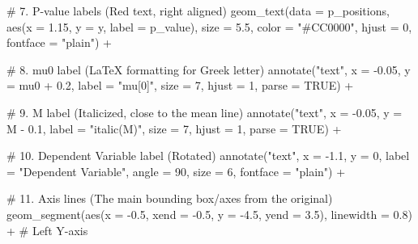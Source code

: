 \documentclass[
  letterpaper,
  DIV=11,
  numbers=noendperiod]{scrreprt}
\newenvironment{Shaded}{\begin{snugshade}}{\end{snugshade}}
\newcommand{\AttributeTok}[1]{\textcolor[rgb]{0.40,0.45,0.13}{#1}}
\newcommand{\CommentTok}[1]{\textcolor[rgb]{0.37,0.37,0.37}{#1}}
\newcommand{\ConstantTok}[1]{\textcolor[rgb]{0.56,0.35,0.01}{#1}}
\newcommand{\DecValTok}[1]{\textcolor[rgb]{0.68,0.00,0.00}{#1}}
\newcommand{\FloatTok}[1]{\textcolor[rgb]{0.68,0.00,0.00}{#1}}
\newcommand{\FunctionTok}[1]{\textcolor[rgb]{0.28,0.35,0.67}{#1}}
\newcommand{\NormalTok}[1]{\textcolor[rgb]{0.00,0.23,0.31}{#1}}
\newcommand{\SpecialCharTok}[1]{\textcolor[rgb]{0.37,0.37,0.37}{#1}}
\newcommand{\StringTok}[1]{\textcolor[rgb]{0.13,0.47,0.30}{#1}}
\begin{document}
\begin{Shaded}
\begin{Highlighting}[]
  \CommentTok{\# 7. P{-}value labels (Red text, right aligned)}
  \FunctionTok{geom\_text}\NormalTok{(}\AttributeTok{data =}\NormalTok{ p\_positions,}
            \FunctionTok{aes}\NormalTok{(}\AttributeTok{x =} \FloatTok{1.15}\NormalTok{, }\AttributeTok{y =}\NormalTok{ y, }\AttributeTok{label =}\NormalTok{ p\_value),}
            \AttributeTok{size =} \FloatTok{5.5}\NormalTok{, }\AttributeTok{color =} \StringTok{"\#CC0000"}\NormalTok{, }\AttributeTok{hjust =} \DecValTok{0}\NormalTok{, }\AttributeTok{fontface =} \StringTok{"plain"}\NormalTok{) }\SpecialCharTok{+}

  \CommentTok{\# 8. mu0 label (LaTeX formatting for Greek letter)}
  \FunctionTok{annotate}\NormalTok{(}\StringTok{"text"}\NormalTok{, }\AttributeTok{x =} \SpecialCharTok{{-}}\FloatTok{0.05}\NormalTok{, }\AttributeTok{y =}\NormalTok{ mu0 }\SpecialCharTok{+} \FloatTok{0.2}\NormalTok{, }\AttributeTok{label =} \StringTok{"mu[0]"}\NormalTok{,}
           \AttributeTok{size =} \DecValTok{7}\NormalTok{, }\AttributeTok{hjust =} \DecValTok{1}\NormalTok{, }\AttributeTok{parse =} \ConstantTok{TRUE}\NormalTok{) }\SpecialCharTok{+}
  
  \CommentTok{\# 9. M label (Italicized, close to the mean line)}
  \FunctionTok{annotate}\NormalTok{(}\StringTok{"text"}\NormalTok{, }\AttributeTok{x =} \SpecialCharTok{{-}}\FloatTok{0.05}\NormalTok{, }\AttributeTok{y =}\NormalTok{ M }\SpecialCharTok{{-}} \FloatTok{0.1}\NormalTok{, }\AttributeTok{label =} \StringTok{"italic(M)"}\NormalTok{,}
           \AttributeTok{size =} \DecValTok{7}\NormalTok{, }\AttributeTok{hjust =} \DecValTok{1}\NormalTok{, }\AttributeTok{parse =} \ConstantTok{TRUE}\NormalTok{) }\SpecialCharTok{+}
  
  \CommentTok{\# 10. Dependent Variable label (Rotated)}
  \FunctionTok{annotate}\NormalTok{(}\StringTok{"text"}\NormalTok{, }\AttributeTok{x =} \SpecialCharTok{{-}}\FloatTok{1.1}\NormalTok{, }\AttributeTok{y =} \DecValTok{0}\NormalTok{, }\AttributeTok{label =} \StringTok{"Dependent Variable"}\NormalTok{,}
           \AttributeTok{angle =} \DecValTok{90}\NormalTok{, }\AttributeTok{size =} \DecValTok{6}\NormalTok{, }\AttributeTok{fontface =} \StringTok{"plain"}\NormalTok{) }\SpecialCharTok{+}
  
  \CommentTok{\# 11. Axis lines (The main bounding box/axes from the original)}
  \FunctionTok{geom\_segment}\NormalTok{(}\FunctionTok{aes}\NormalTok{(}\AttributeTok{x =} \SpecialCharTok{{-}}\FloatTok{0.5}\NormalTok{, }\AttributeTok{xend =} \SpecialCharTok{{-}}\FloatTok{0.5}\NormalTok{, }\AttributeTok{y =} \SpecialCharTok{{-}}\FloatTok{4.5}\NormalTok{, }\AttributeTok{yend =} \FloatTok{3.5}\NormalTok{), }\AttributeTok{linewidth =} \FloatTok{0.8}\NormalTok{) }\SpecialCharTok{+} \CommentTok{\# Left Y{-}axis}
  

\end{Highlighting}
\end{Shaded}
\end{document}
